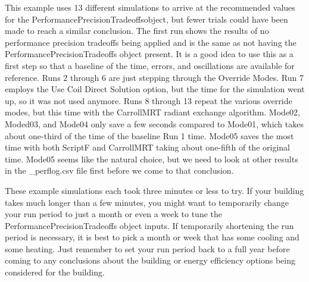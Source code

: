 This example uses 13 different simulations to arrive at the recommended values for the PerformancePrecisionTradeoffsobject, but fewer trials could have been made to reach a similar conclusion. The first run shows the results of no performance precision tradeoffs being applied and is the same as not having the PerformancePrecisionTradeoffs object present. It is a good idea to use this as a first step so that a baseline of the time, errors, and oscillations are available for reference.  Runs 2 through 6 are just stepping through the Override Modes. Run 7 employs the Use Coil Direct Solution option, but the time for the simulation went up, so it was not used anymore.  Runs 8 through 13 repeat the various override modes, but this time with the CarrollMRT radiant exchange algorithm. Mode02, Moded03, and Mode04 only save a few seconds compared to Mode01, which takes about one-third of the time of the baseline Run 1 time. Mode05 saves the most time with both ScriptF and CarrollMRT taking about one-fifth of the original time. Mode05 seems like the natural choice, but we need to look at other results in the \_perflog.csv file first before we come to that conclusion.

These example simulations each took three minutes or less to try. If your building takes much longer than a few minutes, you might want to temporarily change your run period to just a  month or even a week to tune the PerformancePrecisionTradeoffs object inputs. If temporarily shortening the run period is necessary, it is best to pick a month or week that has some cooling and some heating. Just remember to set your run period back to a full year before coming to any conclusions about the building or energy efficiency options being considered for the building.



